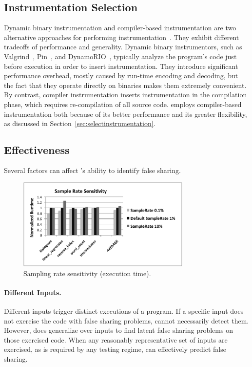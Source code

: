 \label{sec:discussion}

\subsection{Instrumentation Selection}
\label{sec:instrumentationtradeoff}
Dynamic binary instrumentation and compiler-based instrumentation are two alternative approaches for performing instrumentation~\cite{Instrumentation}. They exhibit different tradeoffs of performance and generality. Dynamic binary instrumentors, such as Valgrind~\cite{Valgrind}, Pin~\cite{Pin}, and DynamoRIO~\cite{DynamoRIO}, typically analyze the program's code just before execution in order to insert instrumentation. They introduce significant performance overhead, mostly caused by run-time encoding and decoding, but the fact that they operate directly on binaries makes them extremely convenient. By contrast, compiler instrumentation inserts instrumentation in the compilation phase, which requires re-compilation of all source code. 
\Predator{} employs compiler-based instrumentation both because of its better performance and its greater flexibility, as discussed in Section~\ref{sec:selectinstrumentation}.

\subsection{Effectiveness}
Several factors can affect \Predator{}'s ability to identify false sharing.

\begin{figure}[!t]
\centering 
\includegraphics[width=3.4in]{fig/sample}
\caption{Sampling rate sensitivity (execution time).}
\label{fig:sample}
\end{figure}

\paragraph{Different Inputs.} Different inputs trigger distinct executions of a program. If a specific input does not exercise the code with false sharing problems, \Predator{} cannot necessarily detect them. However, \Predator{} does generalize over inputs to find latent false sharing problems on those exercised code. When any reasonably representative set of inputs are exercised, as is required by any testing regime, \Predator{} can effectively predict false sharing.

